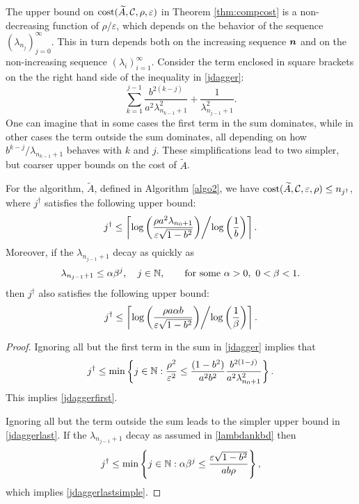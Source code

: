 \documentclass[graybox,footinfo]{svmult}
\begin{document}
The upper bound on $\textup{cost}(\widetilde{A},{\mathcal{C}},\rho,\varepsilon)$ in Theorem \ref{thm:compcost}  is a non-decreasing function of $\rho/\varepsilon$, which depends on the behavior of the sequence $(\lambda_{n_j})_{j=0}^\infty$.  This in turn depends both on the increasing sequence ${\boldsymbol{n}}$ and on the non-increasing sequence $(\lambda_i)_{i=1}^\infty$. Consider the  term enclosed in square brackets on the the right hand side of the inequality in \eqref{jdagger}: \begin{equation*} \label{keysum}
\sum_{k=1}^{j-1} \frac{b^{2(k-j)}}{a^2\lambda_{n_{k-1}+1}^2} + \frac{1}{\lambda_{n_{j-1}+1}^2}.
\end{equation*}
One can imagine that in some cases the first term in the sum dominates, while in other cases the term outside the sum dominates, all depending on how $b^{k-j}/\lambda_{n_{k-1}+1}$ behaves with $k$ and $j$.  These simplifications lead to two simpler, but coarser upper bounds on the cost of $\widetilde{A}$.

\begin{corollary} For the algorithm, $\widetilde{A}$, defined in Algorithm \ref{algo2}, we have $\textup{cost}(\widetilde{A},{\mathcal{C}},\varepsilon,\rho) \le n_{j^\dagger}$, where $j^\dagger$ satisfies the following upper bound:
\begin{equation} \label{jdaggerfirst}
j^\dagger \le \left \lceil \log\left(\frac{\rho a^2\lambda_{n_{0}+1} }{\varepsilon \sqrt{1 - b^2}}\right) \middle/ \log\left(\frac{1}{b}\right) \right \rceil.
\end{equation}
Moreover, if the $\lambda_{n_{j-1}+1}$ decay as quickly as
\begin{equation}
\label{lambdankbd}
\lambda_{n_{j-1}+1} \le \alpha \beta^j,  \quad j \in \bbN,  \qquad \text{for some } \alpha > 0, \ 0 < \beta < 1.
\end{equation}
then $j^\dagger$ also satisfies the following upper bound:
\begin{equation}
\label{jdaggerlastsimple}
j^\dagger \le
\left \lceil \log\left(\frac{\rho a\alpha b }{\varepsilon \sqrt{1 - b^2}}\right) \middle/ \log\left(\frac{1}{\beta}\right) \right \rceil.
\end{equation}
\end{corollary}

\begin{proof}
Ignoring all but the first term in the sum in \eqref{jdagger} implies that 
\begin{equation*} \label{jsumupperbd}
j^\dagger \le \min \left \{j \in \bbN : \frac{\rho^2}{\varepsilon^2} \le \frac{(1 - b^2)}{a^2b^2} \frac{b^{2(1-j)}}{a^2\lambda_{n_{0}+1}^2}    \right\}.
\end{equation*}
This implies \eqref{jdaggerfirst}.

Ignoring all but the term outside the sum leads to the simpler upper bound in \eqref{jdaggerlast}.  If the $\lambda_{n_{j-1}+1}$ decay as assumed in \eqref{lambdankbd} then
\[
j^\dagger \le \min \left \{j \in {\mathbb{N}} :  \alpha \beta^j \le \frac{\varepsilon\sqrt{1 - b^2}}{ab \rho} \right\},
\]
which implies \eqref{jdaggerlastsimple}.
\end{proof}
\end{document}
